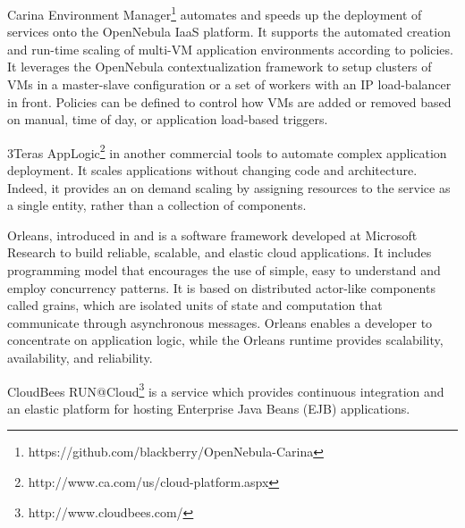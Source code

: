 \documentclass{sig-alternate}
\begin{document}
Carina Environment Manager\footnote{https://github.com/blackberry/OpenNebula-Carina} automates and speeds up the deployment of services onto the OpenNebula IaaS platform. It supports the automated creation and run-time scaling of multi-VM application environments according to policies. It leverages the OpenNebula contextualization framework to setup clusters of VMs in a master-slave configuration or a set of workers with an IP load-balancer in front. Policies can be defined to control how VMs are added or removed based on manual, time of day, or application load-based triggers.

3Teras AppLogic\footnote{http://www.ca.com/us/cloud-platform.aspx} in another commercial tools to automate complex application deployment. It scales applications without changing code and architecture. Indeed, it provides an on demand scaling by assigning resources to the service as a single entity, rather than a collection of components.

Orleans, introduced in \cite{larus2013look} and \cite{bykov2011orleans} is a software framework developed at Microsoft Research to build reliable, scalable, and elastic cloud applications. It includes programming model that encourages the use of simple, easy to understand and employ concurrency patterns. 
It is based on distributed actor-like components called grains, which are isolated units of state and computation that communicate through asynchronous messages. Orleans enables a developer to concentrate on application logic, while the Orleans runtime provides scalability, availability, and reliability.

CloudBees RUN@Cloud\footnote{http://www.cloudbees.com/} is a service which provides continuous integration and an elastic platform for hosting Enterprise Java Beans (EJB) applications.

\end{document}
